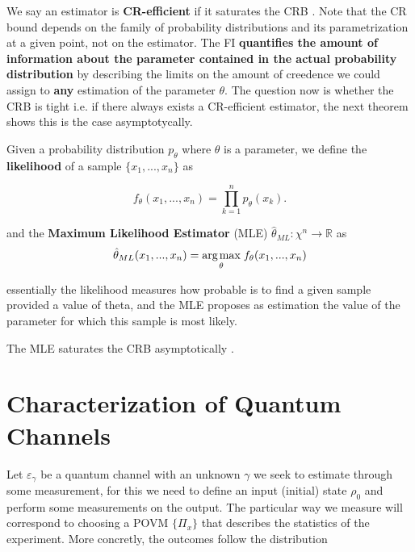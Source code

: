 We say an estimator is \textbf{CR-efficient} if it saturates the CRB \cite{cover_elements_2006,wiseman_quantum_2010}. Note that the CR bound
depends on the family of probability distributions and its parametrization at a given point, not on the estimator. The FI \textbf{quantifies the
  amount of information about the parameter contained in the actual probability distribution} by describing the limits on the amount of
creedence we could assign to \textbf{any} estimation of the parameter $\theta$. The question now is whether the CRB is tight i.e. if there
always exists a CR-efficient estimator, the next theorem shows this is the case asymptotycally.

\begin{definition}
  Given a probability distribution $p_{\theta}$ where $\theta$ is a parameter, we define the \textbf{likelihood} of a sample $\{x_{1},...,x_{n}\}$
  as

  \begin{equation*}
    f_{\theta}(x_{1},...,x_{n}) = \prod_{k=1}^{n}p_{\theta}(x_{k}).
  \end{equation*}

  and the \textbf{Maximum Likelihood Estimator} (MLE)  $\hat{\theta}_{ML} : \chi^{n} \to \mathds{R}$ as
  \begin{equation*}
    \hat{\theta}_{ML}(x_{1}, ..., x_{n}) = \underset{\theta}{\text{arg\hspace{0.05cm}max}}\hspace{0.1cm} f_{\theta}(x_{1},...,x_{n})
  \end{equation*}

\end{definition}

essentially the likelihood measures how probable is to find a given sample provided a value of theta, and the MLE proposes as estimation the
value of the parameter for which this sample is most likely.

\begin{theorem}
The MLE saturates the CRB asymptotically \cite{kay1993fundamentals}.
\end{theorem}

\section{Characterization of Quantum Channels}
Let $\varepsilon_{\gamma}$ be a quantum channel with an unknown $\gamma$ we seek to estimate through some measurement, for this we
need to define an input (initial) state $\rho_{0}$ and perform some measurements on the output. The particular way we measure will
correspond to choosing a POVM $\{\Pi_{x}\}$ that describes the statistics of the experiment. More concretly, the outcomes follow the distribution

